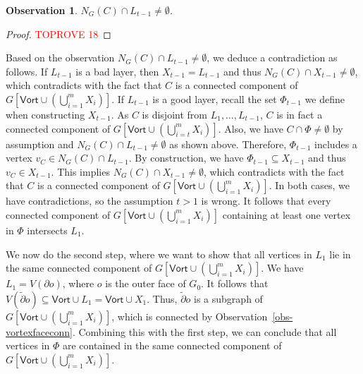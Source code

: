 \documentclass[a4paper,11pt]{article}
\numberwithin{lemma}{section}
\newtheorem{observation}[lemma]{Observation}
\begin{document}
\begin{observation}
$N_G(C) \cap L_{t-1} \neq \emptyset$.
\end{observation}
\begin{proof}\textcolor{red}{TOPROVE 18}\end{proof}

Based on the observation $N_G(C) \cap L_{t-1} \neq \emptyset$, we deduce a contradiction as follows.
If $L_{t-1}$ is a bad layer, then $X_{t-1} = L_{t-1}$ and thus $N_G(C) \cap X_{t-1} \neq \emptyset$, which contradicts with the fact that $C$ is a connected component of $G[\mathsf{Vort} \cup (\bigcup_{i=1}^m X_i)]$.
If $L_{t-1}$ is a good layer, recall the set $\varPhi_{t-1}$ we define when constructing $X_{t-1}$.
As $C$ is disjoint from $L_1,\dots,L_{t-1}$, $C$ is in fact a connected component of $G[\mathsf{Vort} \cup (\bigcup_{i=t}^m X_i)]$.
Also, we have $C \cap \varPhi \neq \emptyset$ by assumption and $N_G(C) \cap L_{t-1} \neq \emptyset$ as shown above.
Therefore, $\varPhi_{t-1}$ includes a vertex $v_C \in N_G(C) \cap L_{t-1}$.
By construction, we have $\varPhi_{t-1} \subseteq X_{t-1}$ and thus $v_C \in X_{t-1}$.
This implies $N_G(C) \cap X_{t-1} \neq \emptyset$, which contradicts with the fact that $C$ is a connected component of $G[\mathsf{Vort} \cup (\bigcup_{i=1}^m X_i)]$.
In both cases, we have contradictions, so the assumption $t>1$ is wrong.
It follows that every connected component of $G[\mathsf{Vort} \cup (\bigcup_{i=1}^m X_i)]$ containing at least one vertex in $\varPhi$ intersects $L_1$.

We now do the second step, where we want to show that all vertices in $L_1$ lie in the same connected component of $G[\mathsf{Vort} \cup (\bigcup_{i=1}^m X_i)]$.
We have $L_1 = V(\partial o)$, where $o$ is the outer face of $G_0$.
It follows that $V(\tilde{\partial} o) \subseteq \mathsf{Vort} \cup L_1 = \mathsf{Vort} \cup X_1$.
Thus, $\tilde{\partial} o$ is a subgraph of $G[\mathsf{Vort} \cup (\bigcup_{i=1}^m X_i)]$, which is connected by Observation~\ref{obs-vortexfaceconn}.
Combining this with the first step, we can conclude that all vertices in $\varPhi$ are contained in the same connected component of $G[\mathsf{Vort} \cup (\bigcup_{i=1}^m X_i)]$.
\end{document}
